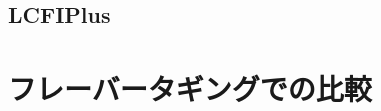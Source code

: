 \subsection{LCFIPlus} \label{Com:FlaTagCom:LCFIPlus}

\section{フレーバータギングでの比較} \label{Com:FlaTagCom:FlavorTaggingComparison}




























